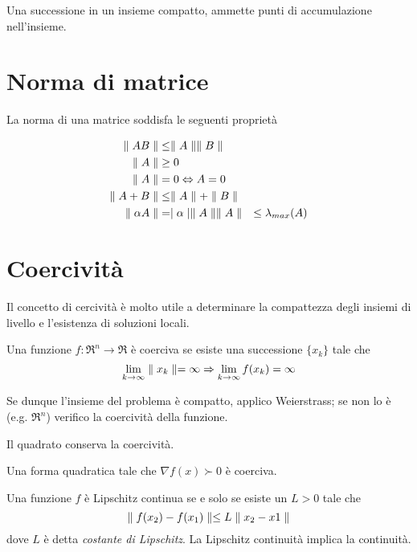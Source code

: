 Una successione in un insieme compatto, ammette punti di accumulazione nell'insieme.


\section{Norma di matrice}
La norma di una matrice soddisfa le seguenti proprietà

\begin{eqnarray}
\label{eqn:matrix-norm-properties}
\begin{split}
\parallel AB \parallel       & \leq \parallel A \parallel\parallel B \parallel \\
\parallel A \parallel        & \geq 0 \\
\parallel A \parallel        & =    0 \Leftrightarrow A=0 \\
\parallel A+B \parallel      & \leq \parallel A \parallel+\parallel B \parallel \\
\parallel \alpha A \parallel & =    \mid \alpha \mid\parallel A \parallel
\parallel A \parallel        & \leq \lambda_{max}(A)
\end{split}
\end{eqnarray}


\section{Coercività}
Il concetto di cercività è molto utile a determinare la compattezza degli insiemi di livello e l'esistenza di soluzioni locali.

\begin{definition}
	\label{dfn:coercive-function}
	Una funzione $f:\Re^{n}\rightarrow\Re$ è coerciva se esiste una successione $\{x_{k}\}$ tale che
	\begin{equation}
	\label{eqn:coercive-function}
	\lim_{k\rightarrow\infty}\parallel x_{k} \parallel=\infty
	\Rightarrow
	\lim_{k\rightarrow\infty}f(x_{k})=\infty
	\end{equation}
\end{definition}

Se dunque l'insieme del problema è compatto, applico Weierstrass; se non lo è (e.g. $\Re^{n}$) verifico la coercività della funzione.

Il quadrato conserva la coercività.

Una forma quadratica tale che $\nabla f(x)\succ0$ è coerciva.

\begin{definition}
	\label{dfn:continuity-lipschitz}
	Una funzione $f$ è Lipschitz continua se e solo se esiste un $L>0$ tale che
	\begin{equation}
		\label{eqn:lipschitz.continuity}
		\parallel f(x_{2})-f(x_{1}) \parallel\leq L\parallel x_{2}-x{1} \parallel
	\end{equation}
	dove $L$ è detta \textit{costante di Lipschitz}.
	La Lipschitz continuità implica la continuità.
\end{definition}

